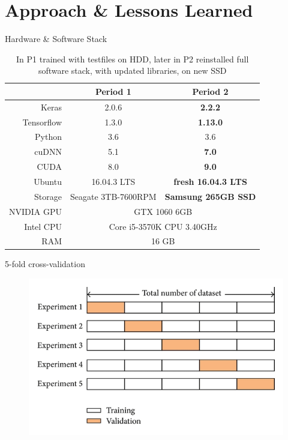 \documentclass{beamer}
\begin{document}
\section{Approach \& Lessons Learned}
\begin{frame}{Hardware \& Software Stack}
\begin{table}
\begin{tabular}{r|cc}
& \textbf{Period 1} & \textbf{Period 2} \\ \hline
Keras &  2.0.6 & \textbf{2.2.2} \\
Tensorflow & 1.3.0 & \textbf{1.13.0} \\
Python & 3.6 & 3.6 \\
cuDNN & 5.1 & \textbf{7.0} \\ 
CUDA & 8.0 & \textbf{9.0} \\
Ubuntu & 16.04.3 LTS & \textbf{fresh 16.04.3 LTS} \\
Storage & Seagate 3TB-7600RPM & \textbf{Samsung 265GB SSD} \\
NVIDIA GPU & \multicolumn{2}{c}{GTX 1060 6GB} \\
Intel CPU &  \multicolumn{2}{c}{Core i5-3570K CPU \@ 3.40GHz} \\
RAM & \multicolumn{2}{c}{16 GB} \\
\end{tabular}
\caption{In P1 trained with testfiles on HDD, later in P2 reinstalled full software stack, with updated libraries, on new SSD}
\end{table}
\end{frame}

\begin{frame}{5-fold cross-validation}
\begin{figure}
\includegraphics[width=\textwidth]{5foldCV}
\end{figure}
\end{frame}
\end{document}
